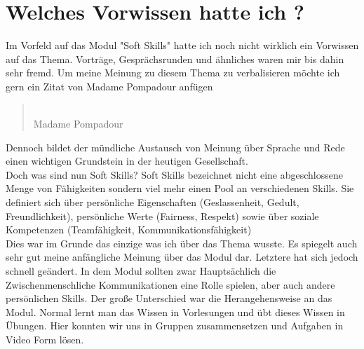 \chapter{Welches Vorwissen hatte ich ? }

Im Vorfeld auf das Modul "Soft Skills" hatte ich noch nicht wirklich ein Vorwissen auf das Thema. Vorträge, Gesprächsrunden und ähnliches waren mir bis dahin sehr fremd. Um meine Meinung zu diesem Thema zu verbalisieren möchte ich gern ein Zitat von Madame Pompadour anfügen

\begin{quote}
	 \dq\\
     Madame Pompadour
\end{quote}

Dennoch bildet der mündliche Austausch von Meinung über Sprache und Rede einen wichtigen Grundstein in der heutigen Gesellschaft.  \\

Doch was sind nun Soft Skills? 
Soft Skills bezeichnet nicht eine abgeschlossene Menge von Fähigkeiten sondern viel mehr einen Pool an verschiedenen Skills. Sie definiert sich über persönliche Eigenschaften (Geslassenheit, Gedult, Freundlichkeit), persönliche Werte (Fairness, Respekt) sowie über soziale Kompetenzen (Teamfähigkeit, Kommunikationsfähigkeit)  ~\cite{SoSk} \\

Dies war im Grunde das einzige was ich über das Thema wusste. Es spiegelt auch sehr gut meine anfängliche Meinung über das Modul dar. Letztere hat sich jedoch schnell geändert. In dem Modul sollten zwar Hauptsächlich die Zwischenmenschliche Kommunikationen eine Rolle spielen, aber auch andere persönlichen Skills.
Der große Unterschied war die Herangehensweise an das Modul. Normal lernt man das Wissen in Vorlesungen und übt dieses Wissen in Übungen. Hier konnten wir uns in Gruppen zusammensetzen und Aufgaben in Video Form lösen. 